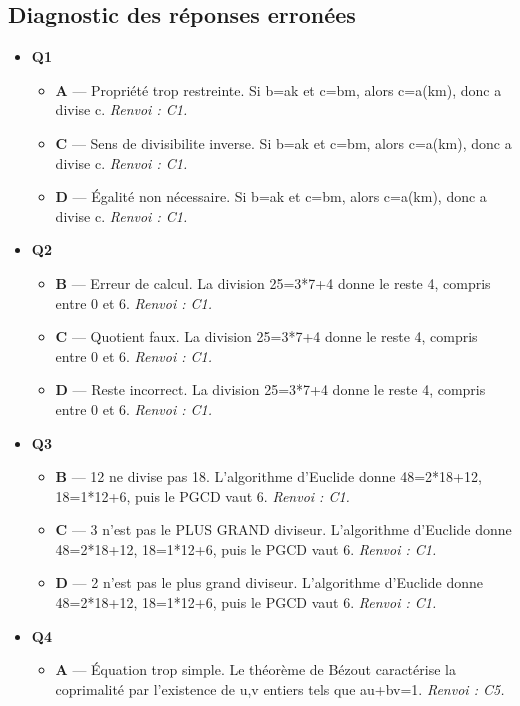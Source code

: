 \subsection*{Diagnostic des réponses erronées}

\begin{itemize}
  \item \textbf{Q1}
  \begin{itemize}
    \item \textbf{A} — Propriété trop restreinte. Si b=ak et c=bm, alors c=a(km), donc a divise c. \emph{Renvoi : C1.}
    \item \textbf{C} — Sens de divisibilite inverse. Si b=ak et c=bm, alors c=a(km), donc a divise c. \emph{Renvoi : C1.}
    \item \textbf{D} — Égalité non nécessaire. Si b=ak et c=bm, alors c=a(km), donc a divise c. \emph{Renvoi : C1.}
  \end{itemize}
  \item \textbf{Q2}
  \begin{itemize}
    \item \textbf{B} — Erreur de calcul. La division 25=3*7+4 donne le reste 4, compris entre 0 et 6. \emph{Renvoi : C1.}
    \item \textbf{C} — Quotient faux. La division 25=3*7+4 donne le reste 4, compris entre 0 et 6. \emph{Renvoi : C1.}
    \item \textbf{D} — Reste incorrect. La division 25=3*7+4 donne le reste 4, compris entre 0 et 6. \emph{Renvoi : C1.}
  \end{itemize}
  \item \textbf{Q3}
  \begin{itemize}
    \item \textbf{B} — 12 ne divise pas 18. L'algorithme d'Euclide donne 48=2*18+12, 18=1*12+6, puis le PGCD vaut 6. \emph{Renvoi : C1.}
    \item \textbf{C} — 3 n'est pas le PLUS GRAND diviseur. L'algorithme d'Euclide donne 48=2*18+12, 18=1*12+6, puis le PGCD vaut 6. \emph{Renvoi : C1.}
    \item \textbf{D} — 2 n'est pas le plus grand diviseur. L'algorithme d'Euclide donne 48=2*18+12, 18=1*12+6, puis le PGCD vaut 6. \emph{Renvoi : C1.}
  \end{itemize}
  \item \textbf{Q4}
  \begin{itemize}
    \item \textbf{A} — Équation trop simple. Le théorème de Bézout caractérise la coprimalité par l'existence de u,v entiers tels que au+bv=1. \emph{Renvoi : C5.}

\end{itemize}
\end{itemize}

